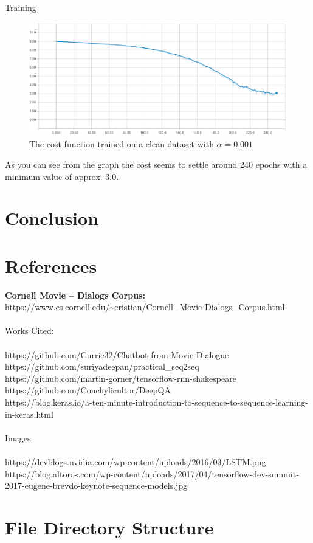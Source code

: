 \documentclass[titlepage]{article}
\begin{document}
Training
\begin{figure}[H]
	\centering
	\includegraphics[width=120mm]{cost-clean-001.png}
	\caption{The cost function trained on a clean dataset with $\alpha = 0.001$}
	\label{fig:cc001}
\end{figure}
As you can see from the graph the cost seems to settle around 240 epochs with a minimum value of approx. 3.0.

\section{Conclusion}

\section{References}
\textbf{Cornell Movie -- Dialogs Corpus: } https://www.cs.cornell.edu/\textasciitilde cristian/Cornell\_Movie-Dialogs\_Corpus.html\\\\
\large{Works Cited:}\\
\small{
\\https://github.com/Currie32/Chatbot-from-Movie-Dialogue
\\https://github.com/suriyadeepan/practical\_seq2seq
\\https://github.com/martin-gorner/tensorflow-rnn-shakespeare 
\\https://github.com/Conchylicultor/DeepQA
\\https://blog.keras.io/a-ten-minute-introduction-to-sequence-to-sequence-learning-in-keras.html
}
~\\~\\
\large{Images:}\\
\small{
\\https://devblogs.nvidia.com/wp-content/uploads/2016/03/LSTM.png
\\https://blog.altoros.com/wp-content/uploads/2017/04/tensorflow-dev-summit-2017-eugene-brevdo-keynote-sequence-models.jpg
}

\section{File Directory Structure}
\end{document}
